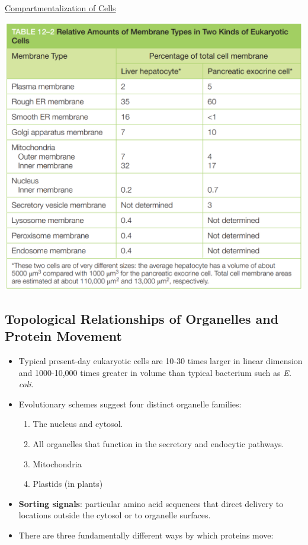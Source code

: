 \documentclass[12pt,letterpaper]{article}
\begin{document}
\begin{secbox}{\hyperlink{12}{Compartmentalization of Cells}}
{\begin{itemize}
        \begin{center}
            \includegraphics[scale=0.45]{images/table12-2.png}
        \end{center}
        \vspace{-1cm}
    \end{itemize}

    \hypertarget{12.1.2}{\subsection*{Topological Relationships of Organelles and Protein Movement}}
    \begin{itemize}
        \item Typical present-day eukaryotic cells are 10-30 times larger in linear dimension and 1000-10,000 times greater in volume than typical bacterium such as \textit{E. coli}.
        \item Evolutionary schemes suggest four distinct organelle families: 
            \begin{enumerate}
                \item The nucleus and cytosol.
                \item All organelles that function in the secretory and endocytic pathways. 
                \item Mitochondria
                \item Plastids (in plants)
            \end{enumerate}
        \item \textbf{Sorting signals}: particular amino acid sequences that direct delivery to locations outside the cytosol or to organelle surfaces.
        \item There are three fundamentally different ways by which proteins move:
        \begin{multicols}{2}
           

\end{multicols}
\end{itemize}}
\end{secbox}
\end{document}
